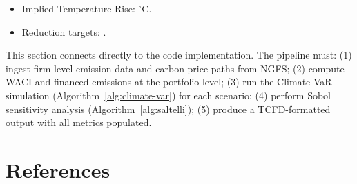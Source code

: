 \documentclass[11pt, a4paper]{article}
\theoremstyle{definition}
\theoremstyle{plain}
\theoremstyle{remark}
\begin{document}
\begin{algorithmbox}[title={TCFD Disclosure Template}]
\begin{enumerate}
\begin{itemize}
\begin{itemize}
                        \item Below 2$^\circ$C: \underline{\hspace{1.5cm}}\%
                        \item Delayed Transition: \underline{\hspace{1.5cm}}\%
                        \item Current Policies: \underline{\hspace{1.5cm}}\%
                    \end{itemize}
              \item Implied Temperature Rise: \underline{\hspace{1.5cm}}$^\circ$C.
              \item Reduction targets: \underline{\hspace{3cm}}.
          \end{itemize}
\end{enumerate}
\end{algorithmbox}

\begin{prereq}
This section connects directly to the code implementation.
The pipeline must:
(1) ingest firm-level emission data and carbon price paths from NGFS;
(2) compute WACI and financed emissions at the portfolio level;
(3) run the Climate VaR simulation (Algorithm~\ref{alg:climate-var}) for each
    scenario;
(4) perform Sobol sensitivity analysis (Algorithm~\ref{alg:saltelli});
(5) produce a TCFD-formatted output with all metrics populated.
\end{prereq}


\section{References}
\label{sec:references}
\end{document}
